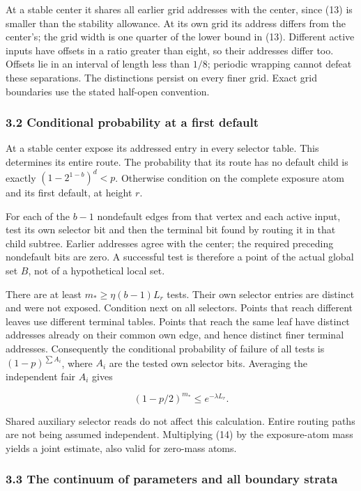 \documentclass[
  11pt,
]{article}
\begin{document}
At a stable center it shares all earlier grid addresses with the center,
since (13) is smaller than the stability allowance. At its own grid its
address differs from the center's; the grid width is one quarter of the
lower bound in (13). Different active inputs have offsets in a ratio
greater than eight, so their addresses differ too. Offsets lie in an
interval of length less than \(1/8\); periodic wrapping cannot defeat
these separations. The distinctions persist on every finer grid. Exact
grid boundaries use the stated half-open convention.

\subsubsection{3.2 Conditional probability at a first
default}\label{conditional-probability-at-a-first-default}

At a stable center expose its addressed entry in every selector table.
This determines its entire route. The probability that its route has no
default child is exactly \((1-2^{1-b})^d<p\). Otherwise condition on the
complete exposure atom and its first default, at height \(r\).

For each of the \(b-1\) nondefault edges from that vertex and each
active input, test its own selector bit and then the terminal bit found
by routing it in that child subtree. Earlier addresses agree with the
center; the required preceding nondefault bits are zero. A successful
test is therefore a point of the actual global set \(B\), not of a
hypothetical local set.

There are at least \(m_*\ge \eta (b-1)L_r\) tests. Their own selector
entries are distinct and were not exposed. Condition next on all
selectors. Points that reach different leaves use different terminal
tables. Points that reach the same leaf have distinct addresses already
on their common own edge, and hence distinct finer terminal addresses.
Consequently the conditional probability of failure of all tests is
\((1-p)^{\sum  A_i}\), where \(A_i\) are the tested own selector bits.
Averaging the independent fair \(A_i\) gives

\[
 (1-p/2)^{m_*}\le e^{-\lambda L_r}.                        \tag{14}
\]

Shared auxiliary selector reads do not affect this calculation. Entire
routing paths are not being assumed independent. Multiplying (14) by the
exposure-atom mass yields a joint estimate, also valid for zero-mass
atoms.

\subsubsection{3.3 The continuum of parameters and all boundary
strata}\label{the-continuum-of-parameters-and-all-boundary-strata}
\end{document}
